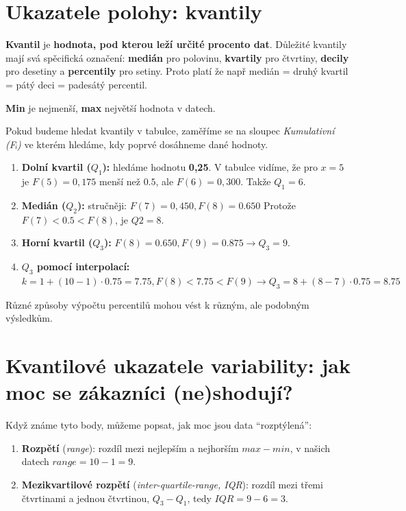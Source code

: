 \documentclass[
  czech,
  11pt,
  letterpaper,
  DIV=11,
  numbers=noendperiod]{scrreprt}
\providecommand{\tightlist}{%
  \setlength{\itemsep}{0pt}\setlength{\parskip}{0pt}}
\begin{document}
\section{Ukazatele polohy: kvantily}\label{ukazatele-polohy-kvantily}

\textbf{Kvantil} je \textbf{hodnota, pod kterou leží určité procento
dat}. Důležité kvantily mají svá spěcifická označení: \textbf{medián}
pro polovinu, \textbf{kvartily} pro čtvrtiny, \textbf{decily} pro
desetiny a \textbf{percentily} pro setiny. Proto platí že např medián =
druhý kvartil = pátý deci = padesátý percentil.

\textbf{Min} je nejmenší, \textbf{max} největší hodnota v datech.

Pokud budeme hledat kvantily v tabulce, zaměříme se na sloupec
\emph{Kumulativní (Fᵢ)} ve kterém hledáme, kdy poprvé dosáhneme dané
hodnoty.

\begin{enumerate}
\def\labelenumi{\arabic{enumi}.}
\tightlist
\item
  \textbf{Dolní kvartil (\(Q_1\)):} hledáme hodnotu \textbf{0,25}. V
  tabulce vidíme, že pro \(x=5\) je \(F(5)=0,175\) menší než \(0.5\),
  ale \(F(6)=0,300\). Takže \(Q_1 = 6\).
\item
  \textbf{Medián (\(Q_2\)):} stručněji: \(F(7)= 0,450, F(8)=0.650\)
  Protože \(F(7) < 0.5 < F(8)\), je \(Q2=8\).
\item
  \textbf{Horní kvartil (\(Q_3\)):}
  \(F(8)=0.650, F(9)=0.875 \longrightarrow Q_3 = 9\).
\item
  \textbf{\(Q_3\) pomocí interpolací:}
  \(k=1 + (10-1)\cdot 0.75 = 7.75, F(8)<7.75<F(9)\longrightarrow Q_3= 8+(8-7) \cdot 0.75=8.75\)
\end{enumerate}

Různé způsoby výpočtu percentilů mohou vést k různým, ale podobným
výsledkům.

\section{Kvantilové ukazatele variability: jak moc se zákazníci
(ne)shodují?}\label{kvantilovuxe9-ukazatele-variability-jak-moc-se-zuxe1kaznuxedci-neshodujuxed}

Když známe tyto body, můžeme popsat, jak moc jsou data ``rozptýlená'':

\begin{enumerate}
\def\labelenumi{\arabic{enumi}.}
\setcounter{enumi}{3}
\tightlist
\item
  \textbf{Rozpětí} (\emph{range}): rozdíl mezi nejlepším a nejhorším
  \(max-min\), v našich datech \(range = 10 - 1 = 9\).
\item
  \textbf{Mezikvartilové rozpětí} (\emph{inter-quartile-range, IQR}):
  rozdíl mezi třemi čtvrtinami a jednou čtvrtinou, \(Q_3-Q_1\), tedy
  \(IQR = 9 - 6 = 3\).
\end{enumerate}
\end{document}
